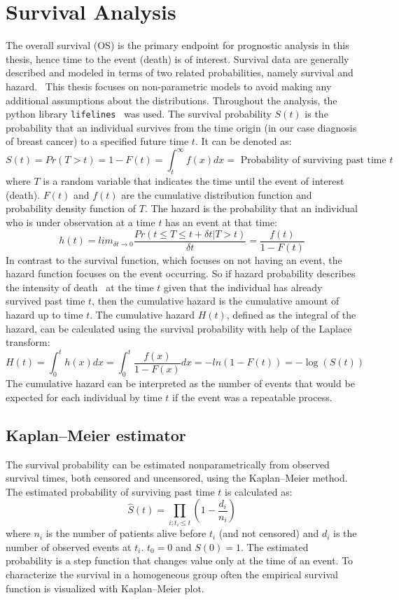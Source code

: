\section{Survival Analysis}
The overall survival (OS) is the primary endpoint for prognostic analysis in this thesis,
hence time to the event (death) is of interest. 
Survival data are generally described and modeled in terms of two related probabilities, namely survival and hazard.~\cite{clark2003survival}
This thesis focuses on non-parametric models to avoid making any additional assumptions about the distributions.
Throughout the analysis, the python library \verb+lifelines+~\cite{davidson2019lifelines} was used.
The survival probability $S(t)$ is the probability that an individual survives from the time origin (in our case diagnosis of breast cancer) to a specified future time $t$.
It can be denoted as: $$S(t) = Pr(T>t) = 1-F(t) = \int_t^\infty f(x) dx = \textrm{ Probability of surviving past time } t $$
where $T$ is a random variable that indicates the time until the event of interest (death). $F(t)$ and $f(t)$ are the cumulative distribution function
and probability density function of $T$. 
The hazard is the probability that an individual who is under observation at a time $t$ has an event at that time:
$$h(t) = lim_{\delta t \rightarrow 0}\frac{Pr(t \leq T \leq t + \delta t | T > t)}{\delta t} = \frac{f(t)}{1-F(t)}$$
In contrast to the survival function, which focuses on not having an event, the hazard function focuses on the event occurring. 
So if hazard probability describes the intensity of death~\cite{STAT_425} at the
time $t$ given that the individual has already survived past time $t$, then
the cumulative hazard is the cumulative amount of hazard up to time $t$.
The cumulative hazard $H(t)$, defined as the integral of the hazard,
can be calculated using the survival probability with help of the Laplace transform:
$$ H(t) = \int_0^t h(x) dx = \int_0^t \frac{f(x)}{1-F(x)} dx = - ln(1 - F(t)) = - \log (S(t)) $$
The cumulative hazard can be interpreted as the number of events that would be expected for each individual by time $t$ if the event was a repeatable process.~\cite{clark2003survival}

\subsection{Kaplan–Meier estimator}
The survival probability can be estimated nonparametrically from observed survival times,
both censored and uncensored, using the Kaplan–Meier method.
The estimated probability of surviving past time $t$ is calculated as:
$$\hat{S}(t) = \prod_{i; t_i \leq t} (1-\frac{d_i}{n_i})$$
where $n_i$ is the number of patients alive before $t_i$ (and not censored) and $d_i$ is the number of observed events at $t_i$. $t_0=0$ and $S(0)=1$.
The estimated probability is a step function that changes value only at the time of an event.
To characterize the survival in a homogeneous group often the empirical survival function is visualized with Kaplan–Meier plot.

